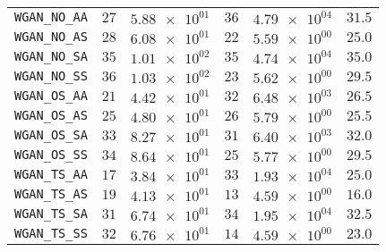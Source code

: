\begin{xltabular}{\textwidth}{l||CC|CC||C}
	\texttt{WGAN\_NO\_AA} & $ 27$ & $ \num{5.88e+01}$ & $ 36$ & $ \num{4.79e+04}$ &$ 31.5$  \\
	\texttt{WGAN\_NO\_AS} & $ 28$ & $ \num{6.08e+01}$ & $ 22$ & $ \num{5.59e+00}$ &$ 25.0$  \\
	\texttt{WGAN\_NO\_SA} & $ 35$ & $ \num{1.01e+02}$ & $ 35$ & $ \num{4.74e+04}$ &$ 35.0$  \\
	\texttt{WGAN\_NO\_SS} & $ 36$ & $ \num{1.03e+02}$ & $ 23$ & $ \num{5.62e+00}$ &$ 29.5$  \\
	\texttt{WGAN\_OS\_AA} & $ 21$ & $ \num{4.42e+01}$ & $ 32$ & $ \num{6.48e+03}$ &$ 26.5$  \\
	\texttt{WGAN\_OS\_AS} & $ 25$ & $ \num{4.80e+01}$ & $ 26$ & $ \num{5.79e+00}$ &$ 25.5$  \\
	\texttt{WGAN\_OS\_SA} & $ 33$ & $ \num{8.27e+01}$ & $ 31$ & $ \num{6.40e+03}$ &$ 32.0$  \\
	\texttt{WGAN\_OS\_SS} & $ 34$ & $ \num{8.64e+01}$ & $ 25$ & $ \num{5.77e+00}$ &$ 29.5$  \\
	\texttt{WGAN\_TS\_AA} & $ 17$ & $ \num{3.84e+01}$ & $ 33$ & $ \num{1.93e+04}$ &$ 25.0$  \\
	\texttt{WGAN\_TS\_AS} & $ 19$ & $ \num{4.13e+01}$ & $ 13$ & $ \num{4.59e+00}$ &$ 16.0$  \\
	\texttt{WGAN\_TS\_SA} & $ 31$ & $ \num{6.74e+01}$ & $ 34$ & $ \num{1.95e+04}$ &$ 32.5$  \\
	\texttt{WGAN\_TS\_SS} & $ 32$ & $ \num{6.76e+01}$ & $ 14$ & $ \num{4.59e+00}$ &$ 23.0$  \\ \hline

\end{xltabular}
